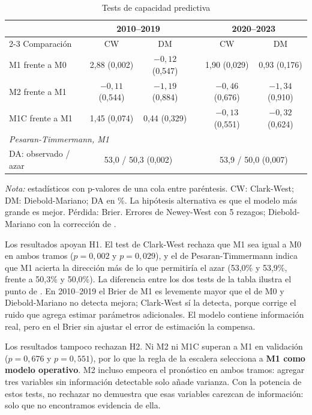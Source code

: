 \documentclass[11pt,a4paper]{article}
\begin{document}
\begin{table}[htbp]\centering\small
\caption{Tests de capacidad predictiva}\label{tab:tests}
\begin{threeparttable}
\begin{tabular}{l cc c cc}
\toprule
 & \multicolumn{2}{c}{2010--2019} & & \multicolumn{2}{c}{2020--2023} \\
\cmidrule{2-3}\cmidrule{5-6}
Comparación & CW & DM & & CW & DM \\
\midrule
M1 frente a M0 & 2,88 (0,002) & $-0{,}12$ (0,547) & & 1,90 (0,029) & 0,93 (0,176) \\
M2 frente a M1 & $-0{,}11$ (0,544) & $-1{,}19$ (0,884) & & $-0{,}46$ (0,676) & $-1{,}34$ (0,910) \\
M1C frente a M1 & 1,45 (0,074) & 0,44 (0,329) & & $-0{,}13$ (0,551) & $-0{,}32$ (0,624) \\
\midrule
\multicolumn{6}{l}{\emph{Pesaran-Timmermann, M1}} \\
DA: observado / azar & \multicolumn{2}{c}{53,0 / 50,3 (0,002)} & & \multicolumn{2}{c}{53,9 / 50,0 (0,007)} \\
\bottomrule
\end{tabular}
\begin{tablenotes}\footnotesize
\item \emph{Nota:} estadísticos con p-valores de una cola entre paréntesis. CW: Clark-West; DM: Diebold-Mariano; DA en \%. La hipótesis alternativa es que el modelo más grande es mejor. Pérdida: Brier. Errores de Newey-West con 5 rezagos; Diebold-Mariano con la corrección de \citet{harvey1997}.
\end{tablenotes}
\end{threeparttable}
\end{table}

Los resultados apoyan H1. El test de Clark-West rechaza que M1 sea igual a M0 en ambos tramos (\(p=0{,}002\) y \(p=0{,}029\)), y el de Pesaran-Timmermann indica que M1 acierta la dirección más de lo que permitiría el azar (53,0\% y 53,9\%, frente a 50,3\% y 50,0\%). La diferencia entre los dos tests de la tabla ilustra el punto de \citet{clark2007}. En 2010--2019 el Brier de M1 es levemente mayor que el de M0 y Diebold-Mariano no detecta mejora; Clark-West sí la detecta, porque corrige el ruido que agrega estimar parámetros adicionales. El modelo contiene información real, pero en el Brier sin ajustar el error de estimación la compensa.

Los resultados tampoco rechazan H2. Ni M2 ni M1C superan a M1 en validación (\(p=0{,}676\) y \(p=0{,}551\)), por lo que la regla de la escalera selecciona a \textbf{M1 como modelo operativo}. M2 incluso empeora el pronóstico en ambos tramos: agregar tres variables sin información detectable solo añade varianza. Con la potencia de estos tests, no rechazar no demuestra que esas variables carezcan de información: solo que no encontramos evidencia de ella.
\end{document}
